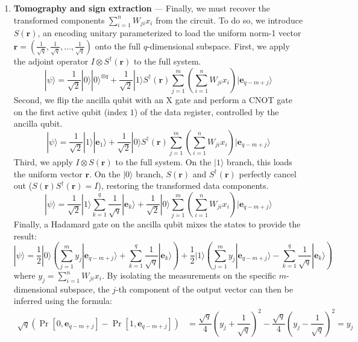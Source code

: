 \documentclass{iopjournal}
\begin{document}
\begin{enumerate}
    \item \textbf{Tomography and sign extraction} — Finally, we must recover the transformed components $\sum_{i=1}^n W_{ji}x_i$ from the circuit. To do so, we introduce $S(\mathbf{r})$, an encoding unitary parameterized to load the uniform norm-1 vector $\mathbf{r} = (\frac{1}{\sqrt{q}}, \frac{1}{\sqrt{q}}, \dots , \frac{1}{\sqrt{q}})$ onto the full $q$-dimensional subspace. First, we apply the adjoint operator $I \otimes S^\dagger(\mathbf{r})$ to the full system.
    \[|\psi\rangle = \dfrac{1}{\sqrt{2}}|0\rangle|0\rangle^{\otimes q} + \dfrac{1}{\sqrt{2}}|1\rangle S^\dagger(\mathbf{r})\sum_{j=1}^{m}\left( \sum_{i=1}^n {W}_{ji}x_{i} \right)|\mathbf{e}_{q-m+j}\rangle\]
    Second, we flip the ancilla qubit with an X gate and perform a CNOT gate on the first active qubit (index $1$) of the data register, controlled by the ancilla qubit.
    \[|\psi\rangle = \dfrac{1}{\sqrt{2}}|1\rangle|\mathbf{e}_{1}\rangle + \dfrac{1}{\sqrt{2}}|0\rangle S^\dagger(\mathbf{r})\sum_{j=1}^{m} \left( \sum_{i=1}^n {W}_{ji}x_{i} \right) |\mathbf{e}_{q-m+j}\rangle\]
    Third, we apply $I \otimes S(\mathbf{r})$ to the full system. On the $|1\rangle$ branch, this loads the uniform vector $\mathbf{r}$. On the $|0\rangle$ branch, $S(\mathbf{r})$ and $S^\dagger(\mathbf{r})$ perfectly cancel out ($S(\mathbf{r})S^\dagger(\mathbf{r}) = I$), restoring the transformed data components.
    \[|\psi\rangle = \dfrac{1}{\sqrt{2}}|1\rangle\sum_{k=1}^q \dfrac{1}{\sqrt{q}}|\mathbf{e}_{k}\rangle + \dfrac{1}{\sqrt{2}}|0\rangle\sum_{j=1}^{m} \left( \sum_{i=1}^n {W}_{ji}x_{i} \right) |\mathbf{e}_{q-m+j}\rangle\]
    Finally, a Hadamard gate on the ancilla qubit mixes the states to provide the result:
    \[|\psi\rangle = \dfrac{1}{2}|0\rangle \left( \sum_{j=1}^m y_j|\mathbf{e}_{q-m+j}\rangle + \sum_{k=1}^q \dfrac{1}{\sqrt{q}}|\mathbf{e}_k\rangle \right) + \dfrac{1}{2}|1\rangle \left( \sum_{j=1}^m y_j|\mathbf{e}_{q-m+j}\rangle - \sum_{k=1}^q \dfrac{1}{\sqrt{q}}|\mathbf{e}_k\rangle \right)\]
    where $y_j = \sum_{i=1}^n W_{ji}x_i$. By isolating the measurements on the specific $m$-dimensional subspace, the $j$-th component of the output vector can then be inferred using the formula:
    \begin{align*}
        \sqrt{q}(\Pr[0, \mathbf{e}_{q-m+j}] - \Pr[1, \mathbf{e}_{q-m+j}]) &= \dfrac{\sqrt{q}}{4}\left(y_j + \dfrac{1}{\sqrt{q}}\right)^2 - \dfrac{\sqrt{q}}{4}\left(y_j - \dfrac{1}{\sqrt{q}}\right)^2
        = y_j
    \end{align*}
    
\end{enumerate}
\end{document}
